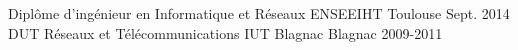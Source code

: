 

\begin{cventries}

  \cventry
    {Diplôme d'ingénieur en Informatique et Réseaux} %
    {ENSEEIHT} %
    {Toulouse} %
    {Sept. 2014} %
    {}
  \cventry
    {DUT Réseaux et Télécommunications}
    {IUT Blagnac}
    {Blagnac}
    {2009-2011}
    {}

    

\end{cventries}
